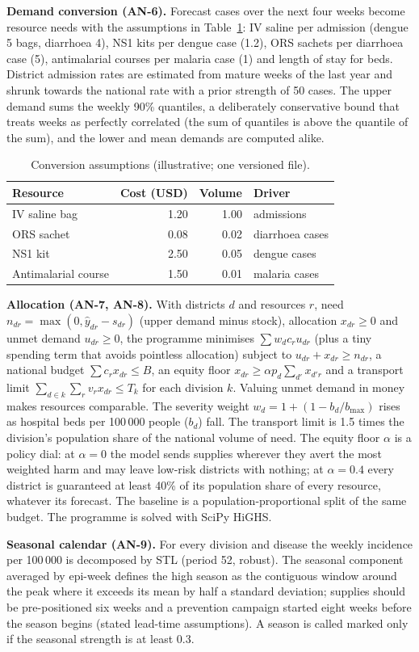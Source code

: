 \textbf{Demand conversion (AN-6).} Forecast cases over the next four weeks become resource needs with the assumptions in Table~\ref{tab:assume}: IV saline per admission (dengue 5 bags, diarrhoea 4), NS1 kits per dengue case (1.2), ORS sachets per diarrhoea case (5), antimalarial courses per malaria case (1) and length of stay for beds. District admission rates are estimated from mature weeks of the last year and shrunk towards the national rate with a prior strength of 50 cases. The upper demand sums the weekly 90\% quantiles, a deliberately conservative bound that treats weeks as perfectly correlated (the sum of quantiles is above the quantile of the sum), and the lower and mean demands are computed alike.
\begin{table}[t]\caption{Conversion assumptions (illustrative; one versioned file).}\label{tab:assume}\centering\small
\begin{tabular}{@{}lrrl@{}}\toprule Resource & Cost (USD) & Volume & Driver \\\midrule
IV saline bag & 1.20 & 1.00 & admissions \\ ORS sachet & 0.08 & 0.02 & diarrhoea cases \\
NS1 kit & 2.50 & 0.05 & dengue cases \\ Antimalarial course & 1.50 & 0.01 & malaria cases \\\bottomrule\end{tabular}\end{table}

\textbf{Allocation (AN-7, AN-8).} With districts $d$ and resources $r$, need $n_{dr}=\max(0,\hat y_{dr}-s_{dr})$ (upper demand minus stock), allocation $x_{dr}\ge0$ and unmet demand $u_{dr}\ge0$, the programme minimises $\sum w_dc_ru_{dr}$ (plus a tiny spending term that avoids pointless allocation) subject to $u_{dr}+x_{dr}\ge n_{dr}$, a national budget $\sum c_rx_{dr}\le B$, an equity floor $x_{dr}\ge\alpha p_d\sum_{d'}x_{d'r}$ and a transport limit $\sum_{d\in k}\sum_rv_rx_{dr}\le T_k$ for each division $k$. Valuing unmet demand in money makes resources comparable. The severity weight $w_d=1+(1-b_d/b_{\max})$ rises as hospital beds per 100\,000 people ($b_d$) fall. The transport limit is 1.5 times the division's population share of the national volume of need. The equity floor $\alpha$ is a policy dial: at $\alpha=0$ the model sends supplies wherever they avert the most weighted harm and may leave low-risk districts with nothing; at $\alpha=0.4$ every district is guaranteed at least 40\% of its population share of every resource, whatever its forecast. The baseline is a population-proportional split of the same budget. The programme is solved with SciPy HiGHS.

\textbf{Seasonal calendar (AN-9).} For every division and disease the weekly incidence per 100\,000 is decomposed by STL (period 52, robust). The seasonal component averaged by epi-week defines the high season as the contiguous window around the peak where it exceeds its mean by half a standard deviation; supplies should be pre-positioned six weeks and a prevention campaign started eight weeks before the season begins (stated lead-time assumptions). A season is called marked only if the seasonal strength is at least 0.3.
